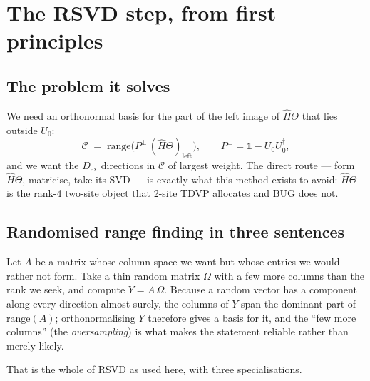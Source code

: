 \documentclass[11pt,a4paper]{article}
\newcommand{\Hb}{\hat{H}}
\newcommand{\Theb}{\Theta}
\newcommand{\Om}{\Omega}
\newcommand{\Pperp}{P^{\perp}}
\newcommand{\Dex}{D_{\mathrm{ex}}}
\begin{document}
\section{The RSVD step, from first principles}
\label{sec:rsvd}

\subsection{The problem it solves}

We need an orthonormal basis for the part of the left image of $\Hb\Theb$ that lies outside
$U_0$:
\begin{equation}
  \mathcal{C} \;=\; \mathrm{range}\big(\Pperp\,(\Hb\Theb)_{\text{left}}\big),
  \qquad \Pperp = \mathbb{1} - U_0 U_0^\dagger,
  \label{eq:target}
\end{equation}
and we want the $\Dex$ directions in $\mathcal{C}$ of largest weight. The direct route --- form
$\Hb\Theb$, matricise, take its SVD --- is exactly what this method exists to avoid:
$\Hb\Theb$ is the rank-4 two-site object that 2-site TDVP allocates and BUG does not.

\subsection{Randomised range finding in three sentences}

Let $A$ be a matrix whose column space we want but whose entries we would rather not form. Take
a thin random matrix $\Om$ with a few more columns than the rank we seek, and compute
$Y = A\,\Om$. Because a random vector has a component along every direction almost surely, the
columns of $Y$ span the dominant part of $\mathrm{range}(A)$; orthonormalising $Y$ therefore
gives a basis for it, and the ``few more columns'' (the \emph{oversampling}) is what makes the
statement reliable rather than merely likely.

That is the whole of RSVD as used here, with three specialisations.
\end{document}
